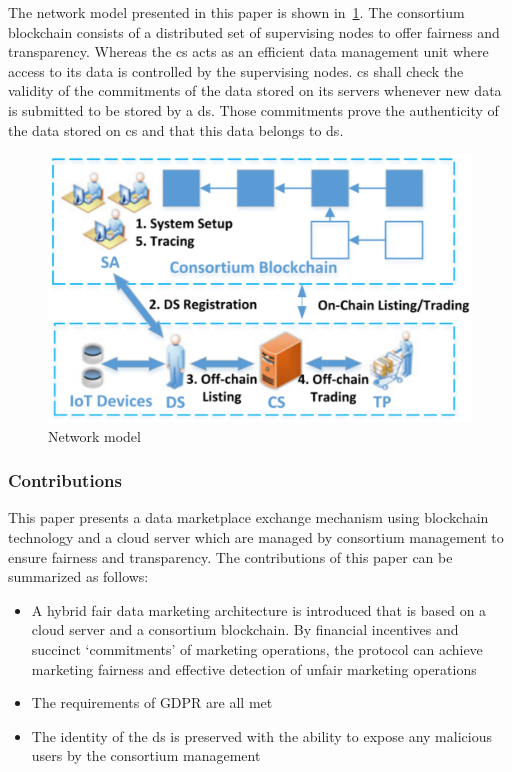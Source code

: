 The network model presented in this paper is shown in~\cref{fig:22-network-model}.
The consortium blockchain consists of a distributed set of supervising nodes to offer fairness and transparency.
Whereas the \ac{cs} acts as an efficient data management unit where access to its data is controlled by the supervising nodes.
\ac{cs} shall check the validity of the commitments of the data stored on its servers whenever new data is submitted to be stored by a \ac{ds}. 
Those commitments prove the authenticity of the data stored on \ac{cs} and that this data belongs to \ac{ds}.

\begin{figure}
\centering
  \includegraphics[width=0.9\linewidth]{imgs/22-network-model.eps}
  \caption{Network model~\cite{liu2022blockchain}}
  \label{fig:22-network-model}
\end{figure}

\subsubsection{Contributions}

This paper presents a data marketplace exchange mechanism using blockchain technology and a cloud server which are managed by consortium management to ensure fairness and transparency.
The contributions of this paper can be summarized as follows:

\begin{itemize}
    \item A hybrid fair data marketing architecture is introduced that is based on a cloud server and a consortium blockchain.
    By financial incentives and succinct ‘commitments’ of marketing operations, the protocol can achieve marketing fairness and effective detection of unfair marketing operations
    \item The requirements of GDPR are all met
    \item The identity of the \ac{ds} is preserved with the ability to expose any malicious users by the consortium management 
\end{itemize}

